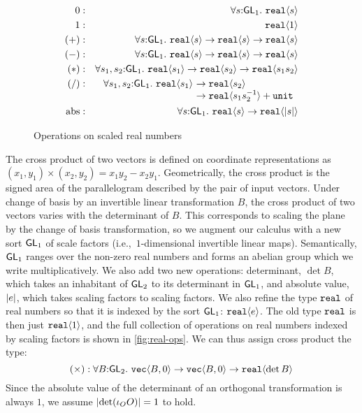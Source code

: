 \begin{figure}[t]
  \centering
  \begin{eqnarray*}
    0   &:& \forall s \mathord:\SynGL{1}.\ \tyPrim{real}{s} \\
    1   &:& \tyPrim{real}{1} \\
    (+) &:& \forall s \mathord:\SynGL{1}.\ \tyPrim{real}{s} \to \tyPrim{real}{s} \to \tyPrim{real}{s} \\
    (-) &:& \forall s \mathord:\SynGL{1}.\ \tyPrim{real}{s} \to \tyPrim{real}{s} \to \tyPrim{real}{s} \\
    (*) &:& \forall s_1,s_2 \mathord:\SynGL{1}.\ \tyPrim{real}{s_1} \to \tyPrim{real}{s_2} \to \tyPrim{real}{s_1s_2} \\
    (/) &:&
    \begin{array}[t]{@{}l@{}l}
      \forall s_1,s_2 \mathord:\SynGL{1}.\ \tyPrim{real}{s_1}\ & \to \tyPrim{real}{s_2} \\
      &\to \tyPrim{real}{s_1s_2^{-1}} + \tyPrimNm{unit} \\
    \end{array}\\
    \mathrm{abs} &:& \forall s \mathord:\SynGL{1}.\ \tyPrim{real}{s} \to \tyPrim{real}{\abs{s}} %
  \end{eqnarray*}
  \caption{Operations on scaled real numbers}
  \label{fig:real-ops}
\end{figure}

The cross product of two vectors is defined on coordinate
representations as $(x_1,y_1) \times (x_2,y_2) = x_1y_2 - x_2y_1$.
Geometrically, the cross product is the signed area of the
parallelogram described by the pair of input vectors.  Under change of
basis by an invertible linear transformation $B$, the cross product of
two vectors varies with the determinant of $B$. This corresponds to
scaling the plane by the change of basis transformation, so we augment
our calculus with a new sort $\mathsf{GL}_1$ of scale factors
(i.e.,~$1$-dimensional invertible linear maps). Semantically,
$\mathsf{GL}_1$ ranges over the non-zero real numbers and forms an abelian
group which we write multiplicatively. We also add two new operations:
determinant, $\det B$, which takes an inhabitant of $\mathsf{GL}_2$ to its
determinant in $\mathsf{GL}_1$, and absolute value, $\lvert e \rvert$, which takes
scaling factors to scaling factors. We also refine the type
$\textup{\texttt{real}}$ of real numbers so that it is indexed by the sort
$\mathsf{GL}_1$: $\textup{\texttt{real}}\langle e \rangle$. The old type $\textup{\texttt{real}}$ is
then just $\textup{\texttt{real}}\langle 1 \rangle$, and the full collection of operations on
real numbers indexed by scaling factors is shown in
\autoref{fig:real-ops}. We can thus assign cross product the type:
\begin{displaymath}
  (\times) : \forall B \mathord: \mathsf{GL}_2.\ \textup{\texttt{vec}}\langle B,0 \rangle \to
  \textup{\texttt{vec}}\langle B,0 \rangle \to \textup{\texttt{real}}\langle \det B \rangle 
\end{displaymath}
Since the absolute value of the determinant of an orthogonal
transformation is always $1$, we assume $\lvert \det (\iota_O O) \rvert = 1$ to
hold.

